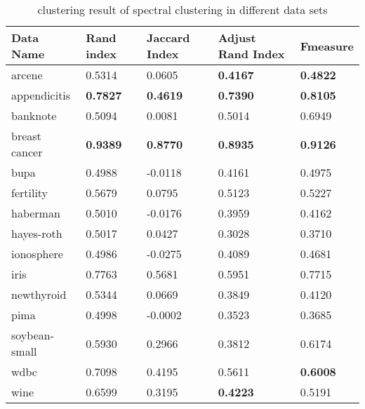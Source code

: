 		\begin{table}[htb]
	      \centering
	      \caption{clustering result of spectral clustering in different data sets}
	      \label{my-label}
	      \begin{tabular}{|lllll|}\hline
	         Data Name & Rand index  & Jaccard Index  & Adjust Rand Index & F\-measure  \\ \hline
         	 arcene         & 0.5314 & 0.0605 & \textbf{0.4167} & \textbf{0.4822}  \\ 
	         appendicitis   & \textbf{0.7827} & \textbf{0.4619} & \textbf{0.7390} & \textbf{0.8105}  \\ 
	         banknote       & 0.5094 & 0.0081 & 0.5014 & 0.6949  \\ 
	         breast cancer  & \textbf{0.9389} & \textbf{0.8770} & \textbf{0.8935} & \textbf{0.9126} \\ 
	         bupa           & 0.4988 & -0.0118 & 0.4161 & 0.4975 \\ 
	         fertility      & 0.5679 & 0.0795 & 0.5123 & 0.5227 \\ 
	         haberman       & 0.5010 & -0.0176 & 0.3959 & 0.4162 \\ 
	         hayes-roth     & 0.5017 & 0.0427 & 0.3028 & 0.3710 \\ 
	         ionosphere     & 0.4986 & -0.0275 & 0.4089 & 0.4681 \\ 
	         iris           & 0.7763 & 0.5681 & 0.5951 & 0.7715 \\ 
	         newthyroid     & 0.5344 & 0.0669 & 0.3849 & 0.4120 \\ 
	         pima           & 0.4998 & -0.0002 & 0.3523 & 0.3685 \\ 
	         soybean-small  & 0.5930 & 0.2966 & 0.3812 & 0.6174 \\ 
	         wdbc           & 0.7098 & 0.4195 & 0.5611 & \textbf{0.6008} \\ 
	         wine           & 0.6599 & 0.3195 & \textbf{0.4223} & 0.5191 \\ 
	         \hline
	      \end{tabular}
	    \end{table}
